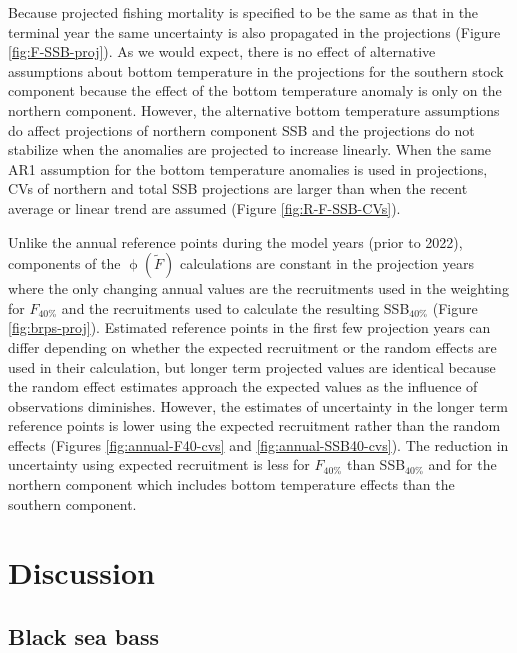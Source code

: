 \documentclass[
]{article}
\begin{document}
Because projected fishing mortality is specified to be the same as that in the terminal year the same uncertainty is also propagated in the projections (Figure \ref{fig:F-SSB-proj}). As we would expect, there is no effect of alternative assumptions about bottom temperature in the projections for the southern stock component because the effect of the bottom temperature anomaly is only on the northern component. However, the alternative bottom temperature assumptions do affect projections of northern component SSB and the projections do not stabilize when the anomalies are projected to increase linearly. When the same AR1 assumption for the bottom temperature anomalies is used in projections, CVs of northern and total SSB projections are larger than when the recent average or linear trend are assumed (Figure \ref{fig:R-F-SSB-CVs}).

Unlike the annual reference points during the model years (prior to 2022), components of the \(\upphi(\widetilde{F})\) calculations are constant in the projection years where the only changing annual values are the recruitments used in the weighting for \(F_{40\%}\) and the recruitments used to calculate the resulting SSB\(_{40\%}\) (Figure \ref{fig:brps-proj}). Estimated reference points in the first few projection years can differ depending on whether the expected recruitment or the random effects are used in their calculation, but longer term projected values are identical because the random effect estimates approach the expected values as the influence of observations diminishes. However, the estimates of uncertainty in the longer term reference points is lower using the expected recruitment rather than the random effects (Figures \ref{fig:annual-F40-cvs} and \ref{fig:annual-SSB40-cvs}). The reduction in uncertainty using expected recruitment is less for \(F_{40\%}\) than SSB\(_{40\%}\) and for the northern component which includes bottom temperature effects than the southern component.

\hypertarget{discussion}{%
\section*{Discussion}\label{discussion}}

\hypertarget{black-sea-bass}{%
\subsection*{Black sea bass}\label{black-sea-bass}}
\end{document}
